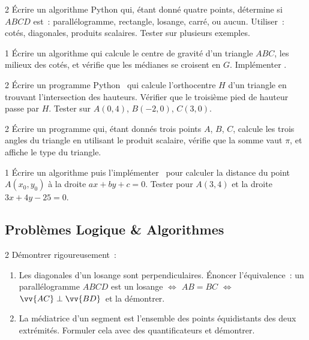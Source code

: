 \begin{exo}{2}
\'Ecrire un algorithme Python qui, \'etant donn\'e quatre points,
d\'etermine si $ABCD$ est~: parall\'elogramme, rectangle, losange, carr\'e, ou aucun.
Utiliser~: cot\'es, diagonales, produits scalaires.
Tester sur plusieurs exemples.
\end{exo}

\begin{exo}{1}
\'Ecrire un algorithme qui calcule le centre de gravité d'un triangle $ABC$,
les milieux des cot\'es, et v\'erifie que les m\'edianes se croisent en $G$.
Impl\'ementer \computer.
\end{exo}

\begin{exo}{2}
\'Ecrire un programme Python \computer\ qui calcule l'orthocentre $H$ d'un triangle
en trouvant l'intersection des hauteurs.
V\'erifier que le troisi\`eme pied de hauteur passe par $H$.
Tester sur $A(0,4)$, $B(-2,0)$, $C(3,0)$.
\end{exo}

\begin{exo}{2}
\'Ecrire un programme qui, \'etant donn\'es trois points $A$, $B$, $C$,
calcule les trois angles du triangle en utilisant le produit scalaire,
v\'erifie que la somme vaut $\pi$, et affiche le type du triangle.
\end{exo}

\begin{exo}{1}
\'Ecrire un algorithme puis l'impl\'ementer \computer\ pour calculer
la distance du point $A(x_0,y_0)$ \`a la droite $ax+by+c=0$.
Tester pour $A(3,4)$ et la droite $3x+4y-25=0$.
\end{exo}

\subsection*{Probl\`emes Logique \& Algorithmes}

\begin{probleme}{2}
D\'emontrer rigoureusement~:
\begin{enumerate}
  \item Les diagonales d'un losange sont perpendiculaires.
        \'Enoncer l'\'equivalence~: \og un parall\'elogramme $ABCD$ est un losange $\Leftrightarrow$
        $AB=BC$ $\Leftrightarrow$ $\vv{AC}\perp\vv{BD}$\fg\ et la d\'emontrer.
  \item La m\'ediatrice d'un segment est l'ensemble des points \'equidistants
        des deux extr\'emit\'es.
        Formuler cela avec des quantificateurs et d\'emontrer.
\end{enumerate}
\end{probleme}

